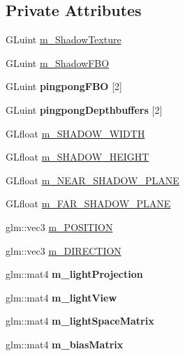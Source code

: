 \subsection*{Private Attributes}
\begin{DoxyCompactItemize}
\item 
G\+Luint \hyperlink{class_shadow_map_aebb26b7e83be13b2e812d3d60e646e69}{m\+\_\+\+Shadow\+Texture}
\item 
G\+Luint \hyperlink{class_shadow_map_aa8a296eaaa25b1ed280f0d5443b6cb82}{m\+\_\+\+Shadow\+F\+BO}
\item 
G\+Luint {\bfseries pingpong\+F\+BO} \mbox{[}2\mbox{]}\hypertarget{class_shadow_map_a35ed57b768f4a11a7563d8edc75e2983}{}\label{class_shadow_map_a35ed57b768f4a11a7563d8edc75e2983}

\item 
G\+Luint {\bfseries pingpong\+Depthbuffers} \mbox{[}2\mbox{]}\hypertarget{class_shadow_map_aac20dd5e218bc9a4cb94c6a8e591eb61}{}\label{class_shadow_map_aac20dd5e218bc9a4cb94c6a8e591eb61}

\item 
G\+Lfloat \hyperlink{class_shadow_map_a01106ae34d919ac828e9786da7a91215}{m\+\_\+\+S\+H\+A\+D\+O\+W\+\_\+\+W\+I\+D\+TH}
\item 
G\+Lfloat \hyperlink{class_shadow_map_aef84eb2ab2d1f970cfdcb155254d7645}{m\+\_\+\+S\+H\+A\+D\+O\+W\+\_\+\+H\+E\+I\+G\+HT}
\item 
G\+Lfloat \hyperlink{class_shadow_map_a12457178e044128f6beaeafc6cff362c}{m\+\_\+\+N\+E\+A\+R\+\_\+\+S\+H\+A\+D\+O\+W\+\_\+\+P\+L\+A\+NE}
\item 
G\+Lfloat \hyperlink{class_shadow_map_ad4391126d86ecbd472125b86e38665b3}{m\+\_\+\+F\+A\+R\+\_\+\+S\+H\+A\+D\+O\+W\+\_\+\+P\+L\+A\+NE}
\item 
glm\+::vec3 \hyperlink{class_shadow_map_ac4dd84a1069dfb1d9d5e63fcf917947b}{m\+\_\+\+P\+O\+S\+I\+T\+I\+ON}
\item 
glm\+::vec3 \hyperlink{class_shadow_map_ad78382c5ab5ebc0de058081389ace23f}{m\+\_\+\+D\+I\+R\+E\+C\+T\+I\+ON}
\item 
glm\+::mat4 {\bfseries m\+\_\+light\+Projection}\hypertarget{class_shadow_map_a5b6ba931f697f84f4da3e265587d9720}{}\label{class_shadow_map_a5b6ba931f697f84f4da3e265587d9720}

\item 
glm\+::mat4 {\bfseries m\+\_\+light\+View}\hypertarget{class_shadow_map_aecef96918788429b8d6299c84a4b45b5}{}\label{class_shadow_map_aecef96918788429b8d6299c84a4b45b5}

\item 
glm\+::mat4 {\bfseries m\+\_\+light\+Space\+Matrix}\hypertarget{class_shadow_map_a0eea8d2dd25ac26d8696cebe6b097c9d}{}\label{class_shadow_map_a0eea8d2dd25ac26d8696cebe6b097c9d}

\item 
glm\+::mat4 {\bfseries m\+\_\+bias\+Matrix}\hypertarget{class_shadow_map_a10adb1b4da43d0fd2820869486ca8092}{}\label{class_shadow_map_a10adb1b4da43d0fd2820869486ca8092}

\end{DoxyCompactItemize}


